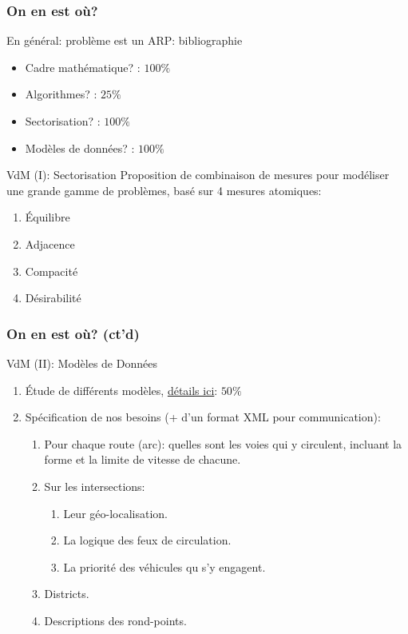 \documentclass[french]{beamer}
\begin{document}
\begin{frame}
\frametitle{On en est où?}

\begin{block}{En général: problème est un ARP: bibliographie}
	\begin{itemize}
		\item Cadre mathématique? \checkmark: $100\%$
		\item Algorithmes? \checkmark: $25\%$
		\item Sectorisation? \checkmark: $100\%$
		\item Modèles de données? \checkmark: $100\%$
	\end{itemize}
\end{block}

\begin{block}{VdM (I): Sectorisation \checkmark}
	Proposition de combinaison de mesures pour modéliser une grande gamme de problèmes, basé sur 4 mesures atomiques:
	\begin{enumerate}
		\item Équilibre
		\item Adjacence
		\item Compacité
		\item Désirabilité
	\end{enumerate}
\end{block}


\end{frame}


\begin{frame}
\frametitle{On en est où? (ct'd)}

\begin{block}{VdM (II): Modèles de Données}
	\begin{enumerate}
		\item Étude de différents modèles, \href{https://docs.google.com/spreadsheets/d/1S1ONNvS4FIHuxg2S6RaSjKU0ZRDhi068NiHiJ_x56pI/edit#gid=0}{détails ici}: \checkmark $50\%$
		\item Spécification de nos besoins (+ d'un format XML pour communication): \checkmark
		\begin{enumerate}
			\item Pour chaque route (arc): quelles sont les voies qui y circulent, incluant la forme et la limite de vitesse de chacune.
			\item Sur les intersections:
			\begin{enumerate}
				\item Leur géo-localisation.
				\item La logique des feux de circulation.
				\item La priorité des véhicules qu s'y engagent.
			\end{enumerate}
			\item Districts.
			\item Descriptions des rond-points.
		\end{enumerate}
		
	\end{enumerate}
\end{block}


\end{frame}


\end{document}
